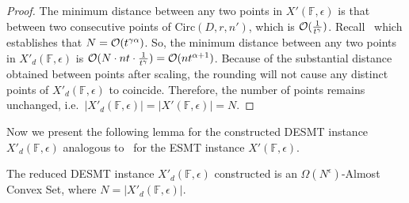 \begin{proof}
    The minimum distance between any two points in $X'(\mathbb{F},\epsilon)$ is that between two consecutive points of $\mathrm{Circ}(D,r,n')$, which is $\mathcal{O}(\frac{1}{t^\gamma})$. Recall~ which establishes that $N = \mathcal{O}(t^{\gamma\alpha})$. So, the minimum distance between any two points in $X'_{d}(\mathbb{F},\epsilon)$ is $\mathcal{O}(N \cdot nt \cdot \frac{1}{t^\gamma}) = \mathcal{O}(nt^{\alpha+1})$. Because of the substantial distance obtained between points after scaling, the rounding will not cause any distinct points of $X'_{d}(\mathbb{F},\epsilon)$ to coincide. Therefore, the number of points remains unchanged, i.e.~$|X'_{d}(\mathbb{F},\epsilon)| = |X'(\mathbb{F},\epsilon)| = N$.
\end{proof}

Now we present the following lemma for the constructed DESMT instance $X'_{d}(\mathbb{F},\epsilon)$ analogous to~ for the ESMT instance $X'(\mathbb{F},\epsilon)$.

\begin{lemma}\label{lem:desmt_redn_size}
    The reduced DESMT instance $X'_{d}(\mathbb{F},\epsilon)$ constructed is an $\Omega(N^\epsilon)$-Almost Convex Set, where  $N = |X'_{d}(\mathbb{F},\epsilon)|$.
\end{lemma}

